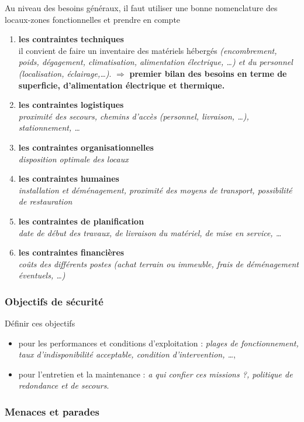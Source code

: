 \documentclass[10pt,a4paper,oneside,titlepage]{report}
\newcommand{\titre}[1]{\textcolor{title}{#1}}
\newcommand{\strong}[1]{\textbf{\titre{#1}}}
\begin{document}
Au niveau des besoins généraux, il faut utiliser une bonne nomenclature des
locaux-zones fonctionnelles et prendre en compte
\begin{enumerate}
\item \strong{les contraintes techniques}\\
il convient de faire un inventaire des matériels hébergés
\textit{(encombrement, poids, dégagement, climatisation, alimentation
électrique, \dots) et du personnel \textit{(localisation, éclairage,\dots)}}.
$\Rightarrow$ \strong{premier bilan des besoins en terme de superficie,
d'alimentation électrique et thermique.}
\item \strong{les contraintes logistiques}\\
\textit{proximité des secours, chemins d'accès (personnel, livraison, \dots),
stationnement, \dots}
\item \strong{les contraintes organisationnelles}\\
\textit{disposition optimale des locaux}
\item \strong{les contraintes humaines}\\
\textit{installation et déménagement, proximité des moyens de transport,
possibilité de restauration}
\item \strong{les contraintes de planification}\\
\textit{date de début des travaux, de livraison du matériel, de mise en service,
\dots}
\item \strong{les contraintes financières}\\
\textit{coûts des différents postes (achat terrain ou immeuble, frais de
déménagement éventuels, \dots)}
\end{enumerate}

\subsubsection{Objectifs de sécurité}

Définir ces objectifs
\begin{itemize}
\item pour les performances et conditions d'exploitation : \textit{plages de
fonctionnement, taux d'indisponibilité acceptable, condition d'intervention,
\dots},
\item pour l'entretien et la maintenance : \textit{a qui confier ces missions ?,
politique de redondance et de secours}.
\end{itemize}

\subsubsection{Menaces et parades}
\end{document}
